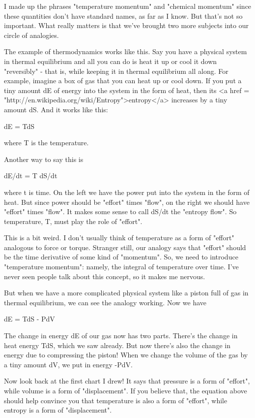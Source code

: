 I made up the phrases "temperature momentum" and
"chemical momentum" since these quantities don't have
standard names, as far as I know.  But that's not so important.  What
really matters is that we've brought two more subjects into our circle
of analogies.

The example of thermodynamics works like this.  Say you have a
physical system in thermal equilibrium and all you can do is heat it
up or cool it down "reversibly" - that is, while keeping
it in thermal equilibrium all along.  For example, imagine a box of gas
that you can heat up or cool down.  If you put a tiny amount dE of
energy into the system in the form of heat, then its <a href =
"http://en.wikipedia.org/wiki/Entropy">entropy</a> increases by a tiny
amount dS.  And it works like this:

dE = TdS

where T is the temperature.  

Another way to say this is

dE/dt = T dS/dt

where t is time.  On the left we have the power put into the system in
the form of heat.  But since power should be "effort" times
"flow", on the right we should have "effort" times
"flow".  It makes some sense to call dS/dt the "entropy
flow".  So temperature, T, must play the role of
"effort".

This is a bit weird.  I don't usually think of temperature as a form
of "effort" analogous to force or torque.  Stranger still,
our analogy says that "effort" should be the time derivative
of some kind of "momentum".  So, we need to introduce
"temperature momentum": namely, the integral of temperature
over time.  I've never seen people talk about this concept, so it
makes me nervous.

But when we have a more complicated physical system like a piston full
of gas in thermal equilibrium, we can see the analogy working.  Now
we have

dE = TdS - PdV

The change in energy dE of our gas now has two parts.  There's the
change in heat energy TdS, which we saw already.  But now there's
also the change in energy due to compressing the piston!  When we
change the volume of the gas by a tiny amount dV, we put in energy
-PdV.

Now look back at the first chart I drew!  It says that pressure is a
form of "effort", while volume is a form of
"displacement".  If you believe that, the equation above
should help convince you that temperature is also a form of
"effort", while entropy is a form of
"displacement".

